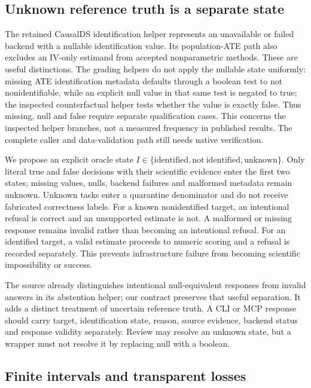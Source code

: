 \subsection{Unknown reference truth is a separate state}

The retained CausalDS identification helper represents an unavailable or failed backend with a nullable identification value. Its population-ATE path also excludes an IV-only estimand from accepted nonparametric methods. These are useful distinctions. The grading helpers do not apply the nullable state uniformly: missing ATE identification metadata defaults through a boolean test to not nonidentifiable, while an explicit null value in that same test is negated to true; the inspected counterfactual helper tests whether the value is exactly false. Thus missing, null and false require separate qualification cases. This concerns the inspected helper branches, not a measured frequency in published results. The complete caller and data-validation path still needs native verification.~\citep{exec25_bor_sources}

We propose an explicit oracle state $I\in\{\mathrm{identified},\mathrm{not\ identified},\mathrm{unknown}\}$. Only literal true and false decisions with their scientific evidence enter the first two states; missing values, nulls, backend failures and malformed metadata remain unknown. Unknown tasks enter a quarantine denominator and do not receive fabricated correctness labels. For a known nonidentified target, an intentional refusal is correct and an unsupported estimate is not. A malformed or missing response remains invalid rather than becoming an intentional refusal. For an identified target, a valid estimate proceeds to numeric scoring and a refusal is recorded separately. This prevents infrastructure failure from becoming scientific impossibility or success.~\citep{exec25_bor_reference}

The source already distinguishes intentional null-equivalent responses from invalid answers in its abstention helper; our contract preserves that useful separation. It adds a distinct treatment of uncertain reference truth. A CLI or MCP response should carry target, identification state, reason, source evidence, backend status and response validity separately. Review may resolve an unknown state, but a wrapper must not resolve it by replacing null with a boolean.~\citep{exec25_bor_sources,exec25_bor_reference}

\subsection{Finite intervals and transparent losses}

